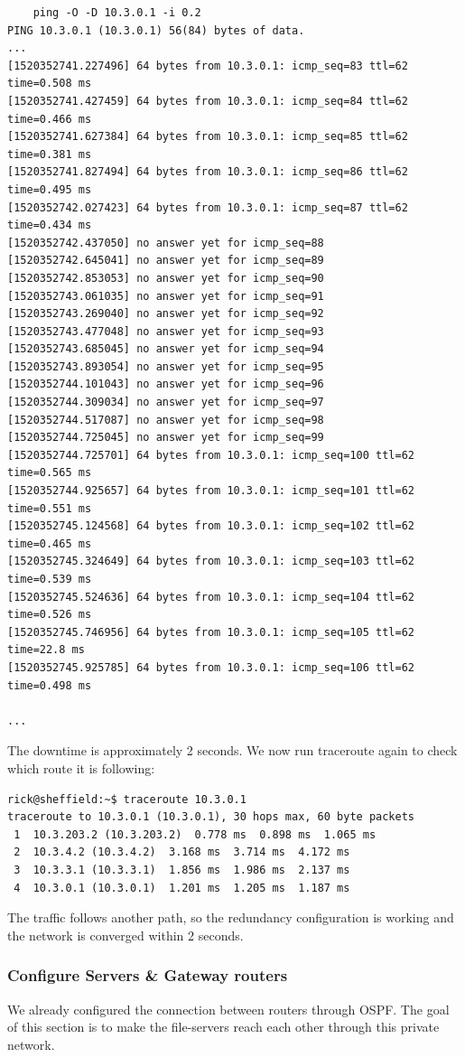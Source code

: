\documentclass[10pt,a4paper]{article}
\begin{document}
\begin{verbatim}
    ping -O -D 10.3.0.1 -i 0.2
PING 10.3.0.1 (10.3.0.1) 56(84) bytes of data.
...
[1520352741.227496] 64 bytes from 10.3.0.1: icmp_seq=83 ttl=62 time=0.508 ms
[1520352741.427459] 64 bytes from 10.3.0.1: icmp_seq=84 ttl=62 time=0.466 ms
[1520352741.627384] 64 bytes from 10.3.0.1: icmp_seq=85 ttl=62 time=0.381 ms
[1520352741.827494] 64 bytes from 10.3.0.1: icmp_seq=86 ttl=62 time=0.495 ms
[1520352742.027423] 64 bytes from 10.3.0.1: icmp_seq=87 ttl=62 time=0.434 ms
[1520352742.437050] no answer yet for icmp_seq=88
[1520352742.645041] no answer yet for icmp_seq=89
[1520352742.853053] no answer yet for icmp_seq=90
[1520352743.061035] no answer yet for icmp_seq=91
[1520352743.269040] no answer yet for icmp_seq=92
[1520352743.477048] no answer yet for icmp_seq=93
[1520352743.685045] no answer yet for icmp_seq=94
[1520352743.893054] no answer yet for icmp_seq=95
[1520352744.101043] no answer yet for icmp_seq=96
[1520352744.309034] no answer yet for icmp_seq=97
[1520352744.517087] no answer yet for icmp_seq=98
[1520352744.725045] no answer yet for icmp_seq=99
[1520352744.725701] 64 bytes from 10.3.0.1: icmp_seq=100 ttl=62 time=0.565 ms
[1520352744.925657] 64 bytes from 10.3.0.1: icmp_seq=101 ttl=62 time=0.551 ms
[1520352745.124568] 64 bytes from 10.3.0.1: icmp_seq=102 ttl=62 time=0.465 ms
[1520352745.324649] 64 bytes from 10.3.0.1: icmp_seq=103 ttl=62 time=0.539 ms
[1520352745.524636] 64 bytes from 10.3.0.1: icmp_seq=104 ttl=62 time=0.526 ms
[1520352745.746956] 64 bytes from 10.3.0.1: icmp_seq=105 ttl=62 time=22.8 ms
[1520352745.925785] 64 bytes from 10.3.0.1: icmp_seq=106 ttl=62 time=0.498 ms

...
\end{verbatim}

The downtime is approximately 2 seconds. We now run traceroute again to check which route it is following:

\begin{verbatim}
rick@sheffield:~$ traceroute 10.3.0.1
traceroute to 10.3.0.1 (10.3.0.1), 30 hops max, 60 byte packets
 1  10.3.203.2 (10.3.203.2)  0.778 ms  0.898 ms  1.065 ms
 2  10.3.4.2 (10.3.4.2)  3.168 ms  3.714 ms  4.172 ms
 3  10.3.3.1 (10.3.3.1)  1.856 ms  1.986 ms  2.137 ms
 4  10.3.0.1 (10.3.0.1)  1.201 ms  1.205 ms  1.187 ms
\end{verbatim}

The traffic follows another path, so the redundancy configuration is working and the network is converged within 2 seconds.

\subsubsection{Configure Servers \& Gateway routers}
We already configured the connection between routers through OSPF. The goal of this section is to make the file-servers reach each other through this private network. 
\end{document}
